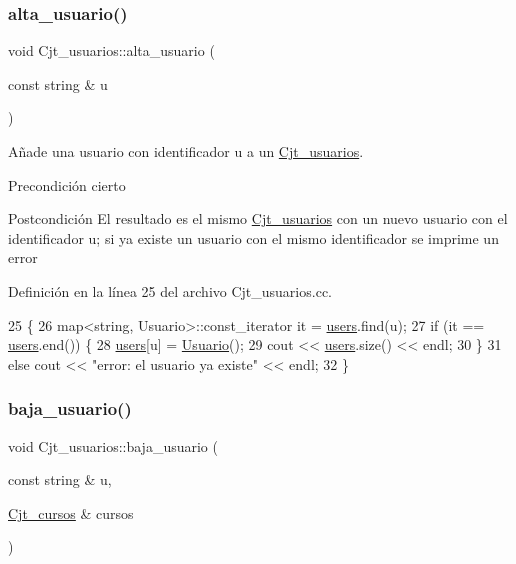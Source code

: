 \subsubsection{\texorpdfstring{alta\+\_\+usuario()}{alta\_usuario()}}
{\footnotesize\ttfamily void Cjt\+\_\+usuarios\+::alta\+\_\+usuario (\begin{DoxyParamCaption}\item[{const string \&}]{u }\end{DoxyParamCaption})}



Añade una usuario con identificador u a un \mbox{\hyperlink{class_cjt__usuarios}{Cjt\+\_\+usuarios}}. 

\begin{DoxyPrecond}{Precondición}
cierto 
\end{DoxyPrecond}
\begin{DoxyPostcond}{Postcondición}
El resultado es el mismo \mbox{\hyperlink{class_cjt__usuarios}{Cjt\+\_\+usuarios}} con un nuevo usuario con el identificador u; si ya existe un usuario con el mismo identificador se imprime un error 
\end{DoxyPostcond}


Definición en la línea 25 del archivo Cjt\+\_\+usuarios.\+cc.


\begin{DoxyCode}
25                                                      \{
26         map<string, Usuario>::const\_iterator it = \mbox{\hyperlink{class_cjt__usuarios_a0b702ca0184d6fb2674cc827d39d5bff}{users}}.find(u);
27         \textcolor{keywordflow}{if} (it == \mbox{\hyperlink{class_cjt__usuarios_a0b702ca0184d6fb2674cc827d39d5bff}{users}}.end()) \{
28           \mbox{\hyperlink{class_cjt__usuarios_a0b702ca0184d6fb2674cc827d39d5bff}{users}}[u] = \mbox{\hyperlink{class_usuario}{Usuario}}();
29           cout << \mbox{\hyperlink{class_cjt__usuarios_a0b702ca0184d6fb2674cc827d39d5bff}{users}}.size() << endl;
30         \}
31         \textcolor{keywordflow}{else} cout << \textcolor{stringliteral}{"error: el usuario ya existe"} << endl;
32       \}
\end{DoxyCode}
\mbox{\label{class_cjt__usuarios_a318dcc3682784e73e0fe98ddbf39350c}} 
\subsubsection{\texorpdfstring{baja\+\_\+usuario()}{baja\_usuario()}}
{\footnotesize\ttfamily void Cjt\+\_\+usuarios\+::baja\+\_\+usuario (\begin{DoxyParamCaption}\item[{const string \&}]{u,  }\item[{\mbox{\hyperlink{class_cjt__cursos}{Cjt\+\_\+cursos}} \&}]{cursos }\end{DoxyParamCaption})}



